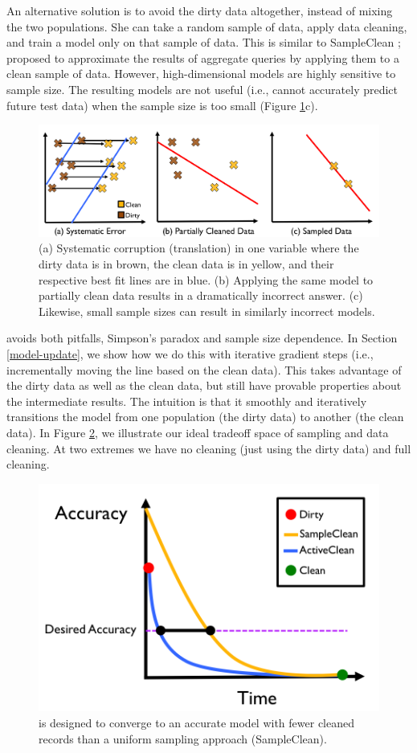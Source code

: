 An alternative solution is to avoid the dirty data altogether, instead of mixing the two populations.
She can take a random sample of data, apply data cleaning, and train a model only on that sample of data.
This is similar to SampleClean \cite{wang1999sample}; proposed to approximate the results of aggregate queries by applying them to a clean sample of data.
However, high-dimensional models are highly sensitive to sample size.
The resulting models are not useful (i.e., cannot accurately predict future test data) when the sample size is too small (Figure \ref{update-arch1}c).

\begin{figure}[ht!]
\centering
 \includegraphics[width=\columnwidth]{figs/update-arch.png}
 \caption{(a) Systematic corruption (translation) in one variable where the dirty data is in brown, the clean data is in yellow, and their respective best fit lines are in blue. 
 (b) Applying the same model to partially clean data results in a dramatically incorrect answer.
(c) Likewise, small sample sizes can result in similarly incorrect models. \label{update-arch1}}
\end{figure}

\sys avoids both pitfalls, Simpson's paradox and sample size dependence.
In Section \ref{model-update}, we show how we do this with iterative gradient steps (i.e., incrementally moving the line based on the clean data).
This takes advantage of the dirty data as well as the clean data, but still have provable properties about the intermediate results.
The intuition is that it smoothly and iteratively transitions the model from one population (the dirty data) to another (the clean data).
In Figure \ref{sys-arch2}, we illustrate our ideal tradeoff space of sampling and data cleaning.
At two extremes we have no cleaning (just using the dirty data) and full cleaning.

\begin{figure}[t]
\centering
 \includegraphics[width=0.5\columnwidth]{figs/arch2.png}
 \caption{\sys is designed to converge to an accurate model with fewer cleaned records than a uniform sampling approach (SampleClean). \label{sys-arch2}}\vspace{-1em}
\end{figure}

